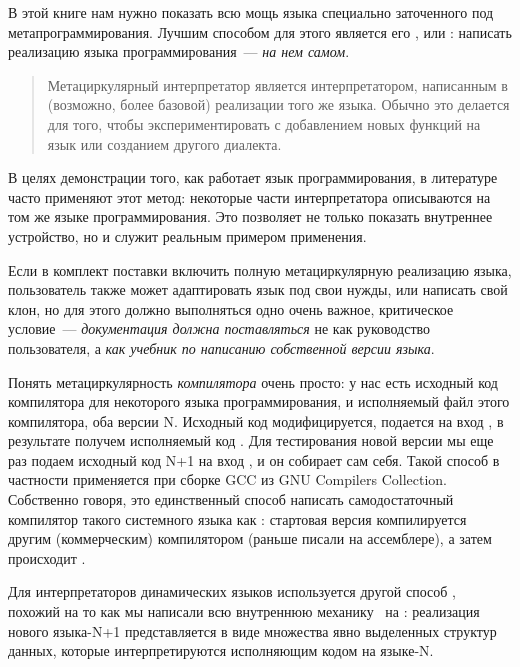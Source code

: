 \label{circ}\secdown

В этой книге нам нужно показать всю мощь языка специально заточенного под
метапрограммирования. Лучшим способом для этого является его ,
или : написать  реализацию языка
программирования\ --- \emph{на нем самом}.


\begin{quotation}
Метациркулярный интерпретатор является интерпретатором, написанным в (возможно,
более базовой) реализации того же языка. Обычно это делается для того, чтобы
экспериментировать с добавлением новых функций на язык или созданием другого
диалекта.
\end{quotation}

В целях демонстрации того, как работает язык программирования, в литературе
часто применяют этот метод: некоторые части интерпретатора описываются на том же
языке программирования. Это позволяет не только показать внутреннее устройство,
но и служит реальным примером применения.

Если в комплект поставки включить полную метациркулярную реализацию языка,
пользователь также может адаптировать язык под свои нужды, или написать свой
клон, но для этого должно выполняться одно очень важное, критическое условие\
--- \emph{документация должна поставляться} не как руководство
пользователя, а \emph{как учебник по написанию собственной версии языка}.

\bigskip
Понять метациркулярность \textit{компилятора} очень просто: у нас есть исходный
код компилятора для некоторого языка программирования, и исполняемый файл этого
компилятора, оба версии N. Исходный код модифицируется, подается на вход
\file{компилятора-N}, в результате получем исполняемый код
. Для тестирования новой версии мы еще раз подаем исходный
код N+1 на вход \file{компилятора-N+1}, и он собирает сам себя. Такой способ в
частности применяется при сборке GCC из GNU Compilers Collection.
Собственно говоря, это единственный способ написать самодостаточный компилятор
такого системного языка как \emc: стартовая версия компилируется другим
(коммерческим) компилятором (раньше писали на ассемблере), а затем
происходит \term{раскрутка компилятора}.

\clearpage
Для интерпретаторов динамических языков используется другой способ \cite{plai},
похожий на то как мы написали всю внутреннюю механику \metal\ на \py:
реализация нового языка-N+1 представляется в виде множества явно выделенных
структур данных, которые интерпретируются исполняющим кодом на языке-N.


